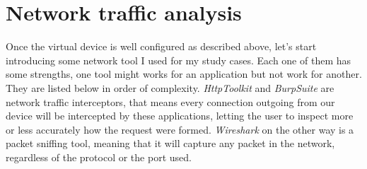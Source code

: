 	\section{Network traffic analysis}
		\par Once the virtual device is well configured as described above, let's start introducing some network tool I used for my study cases. Each one of them has some strengths, one tool might works for an application but not work for another. They are listed below in order of complexity. \textit{HttpToolkit} and \textit{BurpSuite} are network traffic interceptors, that means every connection outgoing from our device will be intercepted by these applications, letting the user to inspect more or less accurately how the request were formed. \textit{Wireshark} on the other way is a packet sniffing tool, meaning that it will capture any packet in the network, regardless of the protocol or the port used. 
		
